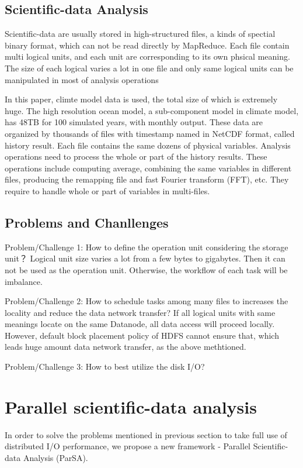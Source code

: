 \documentclass[preprint,12pt]{elsarticle}
\begin{document}
\subsection{Scientific-data Analysis}
Scientific-data are usually stored in high-structured files, a kinds of spectial binary format, which can not be read directly by
MapReduce. Each file contain multi logical units, and each unit are corresponding to its own phsical meaning. The size of 
each logical varies a lot in one file and only same logical units can be manipulated in most of analysis operations \par
In this paper, climte model data is used, the total size of which is extremely huge. The high resolution ocean model, a sub-component
model in climate model, has 48TB for 100 simulated years, with monthly output. These data are organized by thousands of files with 
timestamp named in NetCDF format, called history result. Each file contains the same dozens of physical variables. Analysis 
operations need to process the whole or part of the history results. These operations include computing average, combining the same 
variables in different files, producing the remapping file and fast Fourier transform (FFT), etc. They require to handle whole or
part of variables in multi-files.

\subsection{Problems and Chanllenges} 
Problem/Challenge 1: How to define the operation unit considering the storage unit？ Logical unit size varies a lot from a few bytes to
gigabytes. Then it can not be used as the operation unit. Otherwise, the workflow of each task will be imbalance. \par
Problem/Challenge 2: How to schedule tasks among many files to increases the locality and reduce the data network transfer? If all logical
units with same meanings locate on the same Datanode, all data access will proceed locally. However, default block placement policy of HDFS
cannot ensure that, which leads huge amount data network transfer, as the above methtioned. \par
Problem/Challenge 3: How to best utilize the disk I/O?

\section{Parallel scientific-data analysis}
In order to solve the problems mentioned in previous section to take full use of distributed I/O performance, we propose a new framework - 
Parallel Scientific-data Analysis (ParSA). 
\end{document}
